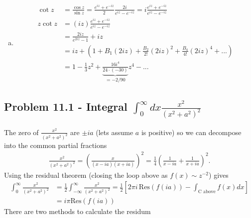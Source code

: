 \documentclass[10pt,a4paper]{book}
\theoremstyle{definition}
\begin{document}
\begin{enumerate}[a)]
\item
\begin{align}
\cot z&=\frac{\cos z}{\sin z}=\frac{e^{iz}+e^{-iz}}{2}\frac{2i}{e^{iz}-e^{-iz}}=i\frac{e^{iz}+e^{-iz}}{e^{iz}-e^{-iz}}\\
z\cot z
&=(iz)\frac{e^{iz}+e^{-iz}}{e^{iz}-e^{-iz}}\\
&=\frac{2iz}{e^{2iz}-1}+iz\\
&=iz+\left(1+B_1(2iz)+\frac{B_2}{2!}(2iz)^2+\frac{B_4}{4!}(2iz)^4+...\right)\\
&=1-\frac{1}{3}z^2+\underbrace{\frac{16i^4}{24\cdot(-30)}}_{=-2/90}z^4-...
\end{align}

\end{enumerate}

\subsection{Problem 11.1 - Integral $\int_0^\infty dx \frac{x^2}{(x^2+a^2)^2}$}
The zero of $\frac{x^2}{(x^2+a^2)^2}$ are $\pm ia$ (lets assume $a$ is positive) so we can decompose into the common partial fractions
\begin{align}
\frac{x^2}{(x^2+a^2)^2}
=\left(\frac{x}{(x-ia)(x+ia)}\right)^2
=\frac{1}{4}\left(\frac{1}{x-ia}+\frac{1}{x+ia}\right)^2.
\end{align}
Using the residual theorem (closing the loop above as $f(x)\sim z^{-2}$) gives
\begin{align}
\int_0^\infty\frac{x^2}{(x^2+a^2)^2}
&=\frac{1}{2}\int_{-\infty}^\infty\frac{x^2}{(x^2+a^2)^2}
=\frac{1}{2}\left[2\pi i\,\text{Res}(f(ia))-\int_\text{C above} f(x)dx\right]\\
&=i\pi \text{Res}(f(ia))
\end{align}
There are two methods to calculate the residum
\end{document}

